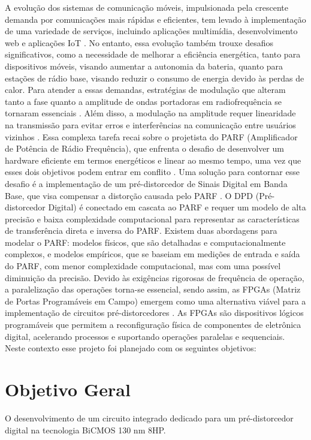 A evolução dos sistemas de comunicação móveis, impulsionada pela crescente demanda por comunicações mais rápidas e eficientes, tem levado à implementação de uma variedade de serviços, incluindo aplicações multimídia, desenvolvimento web e aplicações IoT \cite{John2016}. No entanto, essa evolução também trouxe desafios significativos, como a necessidade de melhorar a eficiência energética, tanto para dispositivos móveis, visando aumentar a autonomia da bateria, quanto para estações de rádio base, visando reduzir o consumo de energia devido às perdas de calor. Para atender a essas demandas, estratégias de modulação que alteram tanto a fase quanto a amplitude de ondas portadoras em radiofrequência se tornaram essenciais \cite{Kenington2000}. Além disso, a modulação na amplitude requer linearidade na transmissão para evitar erros e interferências na comunicação entre usuários vizinhos \cite{Cripps2006}. Essa complexa tarefa recai sobre o projetista do PARF (Amplificador de Potência de Rádio Frequência), que enfrenta o desafio de desenvolver um hardware eficiente em termos energéticos e linear ao mesmo tempo, uma vez que esses dois objetivos podem entrar em conflito \cite{Chavez2018}. Uma solução para contornar esse desafio é a implementação de um pré-distorcedor de Sinais Digital em Banda Base, que visa compensar a distorção causada pelo PARF \cite{Cripps2006}. O DPD (Pré-distorcedor Digital) é conectado em cascata ao PARF e requer um modelo de alta precisão e baixa complexidade computacional para representar as características de transferência direta e inversa do PARF. Existem duas abordagens para modelar o PARF: modelos físicos, que são detalhadas e computacionalmente complexos, e modelos empíricos, que se baseiam em medições de entrada e saída do PARF, com menor complexidade computacional, mas com uma possível diminuição da precisão. Devido às exigências rigorosas de frequência de operação, a paralelização das operações torna-se essencial, sendo assim, as FPGAs (Matriz de Portas Programáveis em Campo) emergem como uma alternativa viável para a implementação de circuitos pré-distorcedores \cite{Pedroni2010}. As FPGAs são dispositivos lógicos programáveis que permitem a reconfiguração física de componentes de eletrônica digital, acelerando processos e suportando operações paralelas e sequenciais. Neste contexto esse projeto foi planejado com os seguintes objetivos:

\section{Objetivo Geral}
O desenvolvimento de um circuito integrado dedicado para um pré-distorcedor digital na tecnologia BiCMOS 130 nm 8HP.
